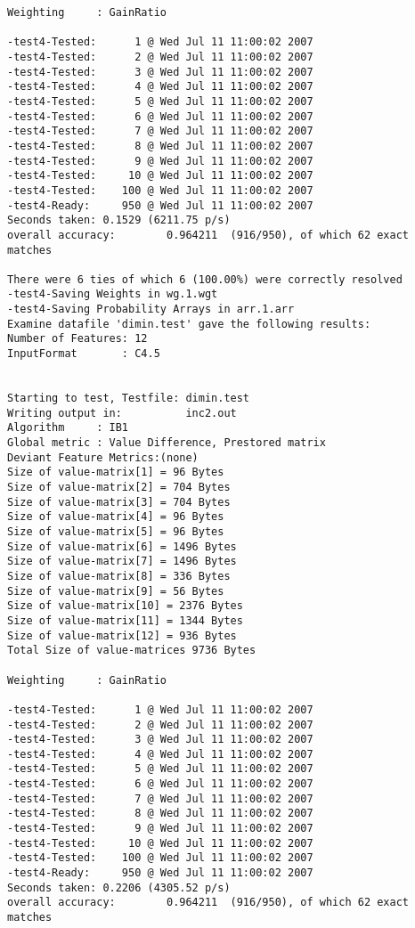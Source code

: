 \documentclass{report}
\begin{document}
\begin{footnotesize}
\begin{verbatim}
Weighting     : GainRatio

-test4-Tested:      1 @ Wed Jul 11 11:00:02 2007
-test4-Tested:      2 @ Wed Jul 11 11:00:02 2007
-test4-Tested:      3 @ Wed Jul 11 11:00:02 2007
-test4-Tested:      4 @ Wed Jul 11 11:00:02 2007
-test4-Tested:      5 @ Wed Jul 11 11:00:02 2007
-test4-Tested:      6 @ Wed Jul 11 11:00:02 2007
-test4-Tested:      7 @ Wed Jul 11 11:00:02 2007
-test4-Tested:      8 @ Wed Jul 11 11:00:02 2007
-test4-Tested:      9 @ Wed Jul 11 11:00:02 2007
-test4-Tested:     10 @ Wed Jul 11 11:00:02 2007
-test4-Tested:    100 @ Wed Jul 11 11:00:02 2007
-test4-Ready:     950 @ Wed Jul 11 11:00:02 2007
Seconds taken: 0.1529 (6211.75 p/s)
overall accuracy:        0.964211  (916/950), of which 62 exact matches 

There were 6 ties of which 6 (100.00%) were correctly resolved
-test4-Saving Weights in wg.1.wgt
-test4-Saving Probability Arrays in arr.1.arr
Examine datafile 'dimin.test' gave the following results:
Number of Features: 12
InputFormat       : C4.5


Starting to test, Testfile: dimin.test
Writing output in:          inc2.out
Algorithm     : IB1
Global metric : Value Difference, Prestored matrix
Deviant Feature Metrics:(none)
Size of value-matrix[1] = 96 Bytes 
Size of value-matrix[2] = 704 Bytes 
Size of value-matrix[3] = 704 Bytes 
Size of value-matrix[4] = 96 Bytes 
Size of value-matrix[5] = 96 Bytes 
Size of value-matrix[6] = 1496 Bytes 
Size of value-matrix[7] = 1496 Bytes 
Size of value-matrix[8] = 336 Bytes 
Size of value-matrix[9] = 56 Bytes 
Size of value-matrix[10] = 2376 Bytes 
Size of value-matrix[11] = 1344 Bytes 
Size of value-matrix[12] = 936 Bytes 
Total Size of value-matrices 9736 Bytes 

Weighting     : GainRatio

-test4-Tested:      1 @ Wed Jul 11 11:00:02 2007
-test4-Tested:      2 @ Wed Jul 11 11:00:02 2007
-test4-Tested:      3 @ Wed Jul 11 11:00:02 2007
-test4-Tested:      4 @ Wed Jul 11 11:00:02 2007
-test4-Tested:      5 @ Wed Jul 11 11:00:02 2007
-test4-Tested:      6 @ Wed Jul 11 11:00:02 2007
-test4-Tested:      7 @ Wed Jul 11 11:00:02 2007
-test4-Tested:      8 @ Wed Jul 11 11:00:02 2007
-test4-Tested:      9 @ Wed Jul 11 11:00:02 2007
-test4-Tested:     10 @ Wed Jul 11 11:00:02 2007
-test4-Tested:    100 @ Wed Jul 11 11:00:02 2007
-test4-Ready:     950 @ Wed Jul 11 11:00:02 2007
Seconds taken: 0.2206 (4305.52 p/s)
overall accuracy:        0.964211  (916/950), of which 62 exact matches 


\end{verbatim}
\end{footnotesize}
\end{document}
